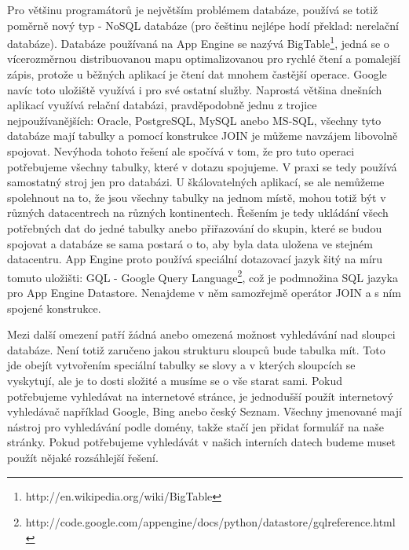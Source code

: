 Pro většinu programátorů je největším problémem databáze, používá se totiž poměrně nový typ - NoSQL databáze (pro češtinu nejlépe hodí překlad: nerelační databáze). Databáze používaná na App Engine se nazývá BigTable\footnote{http://en.wikipedia.org/wiki/BigTable}, jedná se o vícerozměrnou distribuovanou mapu optimalizovanou pro rychlé čtení a pomalejší zápis, protože u běžných aplikací je čtení dat mnohem častější operace. Google navíc toto uložiště využívá i pro své ostatní služby. Naprostá většina dnešních aplikací využívá relační databázi, pravděpodobně jednu z trojice nejpoužívanějších: Oracle, PostgreSQL, MySQL anebo MS-SQL, všechny tyto databáze mají tabulky a pomocí konstrukce JOIN je můžeme navzájem libovolně spojovat. Nevýhoda tohoto řešení ale spočívá v tom, že pro tuto operaci potřebujeme všechny tabulky, které v dotazu spojujeme. V praxi se tedy používá samostatný stroj jen pro databázi. U škálovatelných aplikací, se ale nemůžeme spolehnout na to, že jsou všechny tabulky na jednom místě, mohou totiž být v různých datacentrech na různých kontinentech. Řešením je tedy ukládání všech potřebných dat do jedné tabulky anebo přiřazování do skupin, které se budou spojovat a databáze se sama postará o to, aby byla data uložena ve stejném datacentru. App Engine proto používá speciální dotazovací jazyk šitý na míru tomuto uložišti: GQL - Google Query Language\footnote{http://code.google.com/appengine/docs/python/datastore/gqlreference.html},
což je podmnožina SQL jazyka pro App Engine Datastore. Nenajdeme v něm samozřejmě operátor JOIN a s ním spojené konstrukce.

Mezi další omezení patří žádná anebo omezená možnost vyhledávání nad sloupci databáze. Není totiž zaručeno jakou strukturu sloupců bude tabulka mít. Toto jde obejít vytvořením speciální tabulky se slovy a v kterých sloupcích se vyskytují, ale je to dosti složité a musíme se o vše starat sami. Pokud potřebujeme vyhledávat na internetové stránce, je jednodušší použít internetový vyhledávač například Google, Bing anebo český Seznam. Všechny jmenované mají nástroj pro vyhledávání podle domény, takže stačí jen přidat formulář na naše stránky. Pokud potřebujeme vyhledávát v našich interních datech budeme muset použít nějaké rozsáhlejší řešení.

